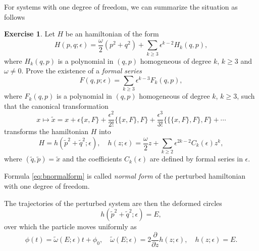 \documentclass[english,fontsize=11pt,paper=b5]{scrbook}
\theoremstyle{definition}
\newtheorem{exercise}{Exercise}[chapter]
\begin{document}
      For systems with one degree of freedom, we can summarize the situation as follows
      \begin{exercise}
        Let $H$ be an hamiltonian of the form
        \begin{equation}
          H(p,q; \epsilon) = \frac{\omega}{2}(p^2 + q^2) + \sum_{k\geq 3} \epsilon^{k-2} H_k(q,p),
        \end{equation}
        where $H_k(q,p)$ is a polynomial in $(q,p)$ homogeneous of degree $k$, $k\geq3$ and $\omega \neq 0$.
        Prove the existence of a \emph{formal series}
        \begin{equation}
          F(q,p; \epsilon) = \sum_{k\geq 3} \epsilon^{k-3} F_k(q,p),
        \end{equation}
        where $F_k(q,p)$ is a polynomial in $(q,p)$ homogeneous of degree $k$, $k\geq3$, such that the canonical transformation
        \begin{equation}\label{eq:ictbnf}
          x \mapsto \widetilde x = x + \epsilon \big\{x, F\big\}
          + \frac{\epsilon^2}{2!} \big\{\big\{x, F\big\}, F\big\}
          + \frac{\epsilon^3}{3!} \big\{\big\{\big\{x, F\big\}, F\big\}, F\big\} + \cdots
        \end{equation}
        transforms the hamiltonian $H$ into
        \begin{equation}\label{eq:bnormalform}
          H = h(\widetilde p^2 + \widetilde q^2; \epsilon),\quad
          h(z;\epsilon) = \frac\omega2 z + \sum_{k\geq 2} \epsilon^{2k-2}C_k(\epsilon) z^k,
        \end{equation}
        where $(\widetilde q, \widetilde p) = \widetilde x$ and the coefficients $C_k(\epsilon)$ are defined by formal series in $\epsilon$.
      \end{exercise}

      Formula \eqref{eq:bnormalform} is called \emph{normal form} of the perturbed hamiltonian with one degree of freedom.

      The trajectories of the perturbed system are then the deformed circles
      \begin{equation}
        h(\widetilde p^2 + \widetilde q^2; \epsilon) = E,
      \end{equation}
      over which the particle moves uniformly as
      \begin{equation}
        \phi(t) = \widetilde\omega(E;\epsilon) t + \phi_0,
        \quad \widetilde\omega(E; \epsilon) = 2\frac{\partial}{\partial z}h(z;\epsilon), \quad h(z;\epsilon) = E.
      \end{equation}
\end{document}
